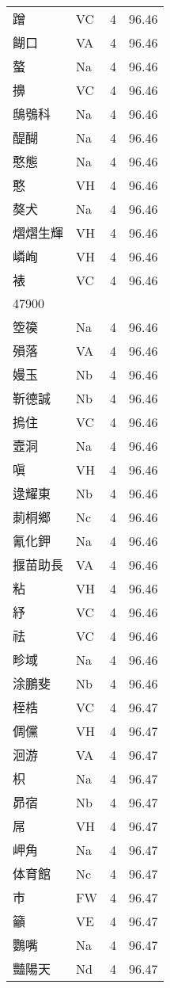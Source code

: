 \documentclass[twocolumn]{book}
\begin{document}
\begin{supertabular}{llrr}
蹭 & VC & 4 &  96.46\\
餬口 & VA & 4 &  96.46\\
螯 & Na & 4 &  96.46\\
擤 & VC & 4 &  96.46\\
鴟鴞科 & Na & 4 &  96.46\\
醍醐 & Na & 4 &  96.46\\
憨態 & Na & 4 &  96.46\\
憨 & VH & 4 &  96.46\\
獒犬 & Na & 4 &  96.46\\
熠熠生輝 & VH & 4 &  96.46\\
嶙峋 & VH & 4 &  96.46\\
裱 & VC & 4 &  96.46\\
47900\\
箜篌 & Na & 4 &  96.46\\
殞落 & VA & 4 &  96.46\\
嫚玉 & Nb & 4 &  96.46\\
靳德誠 & Nb & 4 &  96.46\\
摀住 & VC & 4 &  96.46\\
壼洞 & Na & 4 &  96.46\\
嗔 & VH & 4 &  96.46\\
逯耀東 & Nb & 4 &  96.46\\
莿桐鄉 & Nc & 4 &  96.46\\
氰化鉀 & Na & 4 &  96.46\\
揠苗助長 & VA & 4 &  96.46\\
粘 & VH & 4 &  96.46\\
紓 & VC & 4 &  96.46\\
祛 & VC & 4 &  96.46\\
畛域 & Na & 4 &  96.46\\
涂鵬斐 & Nb & 4 &  96.46\\
桎梏 & VC & 4 &  96.47\\
倜儻 & VH & 4 &  96.47\\
洄游 & VA & 4 &  96.47\\
枳 & Na & 4 &  96.47\\
昴宿 & Nb & 4 &  96.47\\
屌 & VH & 4 &  96.47\\
岬角 & Na & 4 &  96.47\\
体育館 & Nc & 4 &  96.47\\
巿 & FW & 4 &  96.47\\
籲 & VE & 4 &  96.47\\
鸚嘴 & Na & 4 &  96.47\\
豔陽天 & Nd & 4 &  96.47\\

\end{supertabular}
\end{document}
